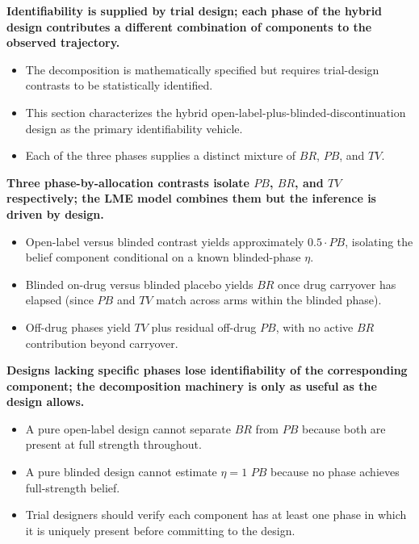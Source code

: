 \documentclass[
  11pt,
]{article}
\begin{document}
\textbf{Identifiability is supplied by trial design; each phase of the hybrid design contributes a different combination of components to the observed trajectory.}

\begin{itemize}\setlength{\itemsep}{2pt}\setlength{\parskip}{0pt}
\item The decomposition is mathematically specified but requires trial-design contrasts to be statistically identified.
\item This section characterizes the hybrid open-label-plus-blinded-discontinuation design as the primary identifiability vehicle.
\item Each of the three phases supplies a distinct mixture of $BR$, $PB$, and $TV$.
\end{itemize}

\textbf{Three phase-by-allocation contrasts isolate $PB$, $BR$, and $TV$ respectively; the LME model combines them but the inference is driven by design.}

\begin{itemize}\setlength{\itemsep}{2pt}\setlength{\parskip}{0pt}
\item Open-label versus blinded contrast yields approximately $0.5 \cdot PB$, isolating the belief component conditional on a known blinded-phase $\eta$.
\item Blinded on-drug versus blinded placebo yields $BR$ once drug carryover has elapsed (since $PB$ and $TV$ match across arms within the blinded phase).
\item Off-drug phases yield $TV$ plus residual off-drug $PB$, with no active $BR$ contribution beyond carryover.
\end{itemize}

\textbf{Designs lacking specific phases lose identifiability of the corresponding component; the decomposition machinery is only as useful as the design allows.}

\begin{itemize}\setlength{\itemsep}{2pt}\setlength{\parskip}{0pt}
\item A pure open-label design cannot separate $BR$ from $PB$ because both are present at full strength throughout.
\item A pure blinded design cannot estimate $\eta = 1$ $PB$ because no phase achieves full-strength belief.
\item Trial designers should verify each component has at least one phase in which it is uniquely present before committing to the design.
\end{itemize}
\end{document}
